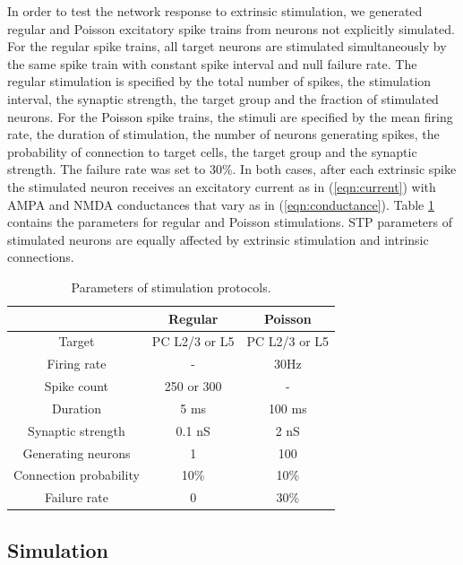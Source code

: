 In order to test the network response to extrinsic stimulation, we generated regular and Poisson excitatory spike trains from neurons not explicitly simulated. For the regular spike trains, all target neurons are stimulated simultaneously by the same spike train with constant spike interval and null failure rate. The regular stimulation is specified by the total number of spikes, the stimulation interval, the synaptic strength, the target group and the fraction of stimulated neurons. For the Poisson spike trains, the stimuli are specified by the mean firing rate, the duration of stimulation, the number of neurons generating spikes, the probability of connection to target cells, the target group and the synaptic strength. The failure rate was set to 30\%. In both cases, after each extrinsic spike the stimulated neuron receives an excitatory current as in (\ref{eqn:current}) with AMPA and NMDA conductances that vary as in (\ref{eqn:conductance}). Table \ref{tab:parm_stim} contains the parameters for regular and Poisson stimulations. STP parameters of stimulated neurons are equally affected by extrinsic stimulation and intrinsic connections. \\

\begin{table}
    \centering
    \begin{tabular}{|c|c|c|} 
     \hline
      & Regular & Poisson \\[2pt]
    \hline\hline
    Target  & PC L2/3 or L5 & PC L2/3 or L5 \\[1pt]
    \hline
    Firing rate & - & 30Hz \\[1pt]
    \hline
    Spike count  & 250 or 300 & - \\[1pt]
    \hline
    Duration  & 5 ms & 100 ms \\[1pt]
    \hline
    Synaptic strength  & 0.1 nS & 2 nS \\[1pt]
    \hline
    Generating neurons  & 1 & 100 \\[1pt]
    \hline
    Connection probability  & 10\% & 10\% \\[1pt]
    \hline
    Failure rate  & 0 & 30\% \\[1pt]
    \hline
    \end{tabular}
    \caption{Parameters of stimulation protocols.}
    \label{tab:parm_stim}
\end{table}

\subsection*{Simulation}

